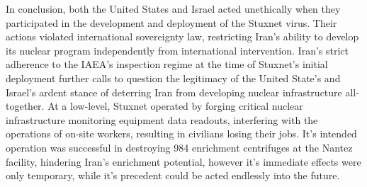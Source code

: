 \documentclass[12pt]{article}
\begin{document}
\begin{multicols}{2}
In conclusion, both the United States and Israel acted unethically when they participated in the development and deployment of the Stuxnet virus. Their actions violated international sovereignty law, restricting Iran's ability to develop its nuclear program independently from international intervention. Iran's strict adherence to the IAEA's inspection regime at the time of Stuxnet's initial deployment further calls to question the legitimacy of the United State's and Israel's ardent stance of deterring Iran from developing nuclear infrastructure all-together. At a low-level, Stuxnet operated by forging critical nuclear infrastructure monitoring equipment data readouts, interfering with the operations of on-site workers, resulting in civilians losing their jobs. It's intended operation was successful in destroying 984 enrichment centrifuges at the Nantez facility, hindering Iran's enrichment potential, however it's immediate effects were only temporary, while it's precedent could be acted endlessly into the future.
 

\end{multicols}

\nocite{*}



\newpage

\end{document}
